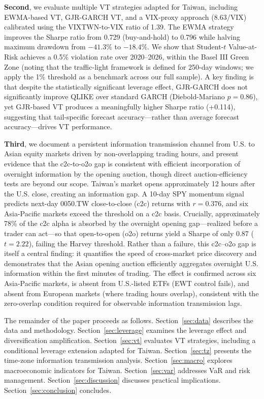 \textbf{Second}, we evaluate multiple VT strategies adapted for Taiwan, including EWMA-based VT, GJR-GARCH VT, and a VIX-proxy approach ($8.63/\text{VIX}$) calibrated using the VIXTWN-to-VIX ratio of 1.39. The EWMA strategy improves the Sharpe ratio from 0.729 (buy-and-hold) to 0.796 while halving maximum drawdown from $-41.3\%$ to $-18.4\%$. We show that Student-$t$ Value-at-Risk achieves a 0.5\% violation rate over 2020--2026, within the Basel III Green Zone (noting that the traffic-light framework is defined for 250-day windows; we apply the 1\% threshold as a benchmark across our full sample). A key finding is that despite the statistically significant leverage effect, GJR-GARCH does not significantly improve QLIKE over standard GARCH (Diebold-Mariano $p = 0.86$), yet GJR-based VT produces a meaningfully higher Sharpe ratio (+0.114), suggesting that tail-specific forecast accuracy---rather than average forecast accuracy---drives VT performance.

\textbf{Third}, we document a persistent information transmission channel from U.S. to Asian equity markets driven by non-overlapping trading hours, %
and present evidence that the c2c-to-o2o gap is consistent with efficient incorporation of overnight information by the opening auction, though direct auction-efficiency tests are beyond our scope. Taiwan's market opens approximately 12 hours after the U.S. close, creating an information gap. A 10-day SPY momentum signal predicts next-day 0050.TW close-to-close (c2c) returns with $r = 0.376$, and six Asia-Pacific markets exceed the \citet{harvey2016} threshold on a c2c basis. Crucially, approximately 78\% of the c2c alpha is absorbed by the overnight opening gap---realized before a trader can act---so that open-to-open (o2o) returns yield a Sharpe of only 0.87 ($t = 2.22$), failing the Harvey threshold. Rather than a failure, this c2c--o2o gap is itself a central finding: it quantifies the speed of cross-market price discovery and demonstrates that the Asian opening auction efficiently aggregates overnight U.S. information within the first minutes of trading. The effect is confirmed across six Asia-Pacific markets, is absent from U.S.-listed ETFs (EWT control fails), and absent from European markets (where trading hours overlap), consistent with the zero-overlap condition required for observable information transmission lags.

The remainder of the paper proceeds as follows. Section~\ref{sec:data} describes the data and methodology. Section~\ref{sec:leverage} examines the leverage effect and diversification amplification. Section~\ref{sec:vt} evaluates VT strategies, including a conditional leverage extension adapted for Taiwan. Section~\ref{sec:tz} presents the time-zone information transmission analysis. Section~\ref{sec:macro} explores macroeconomic indicators for Taiwan. Section~\ref{sec:var} addresses VaR and risk management. Section~\ref{sec:discussion} discusses practical implications. Section~\ref{sec:conclusion} concludes.


